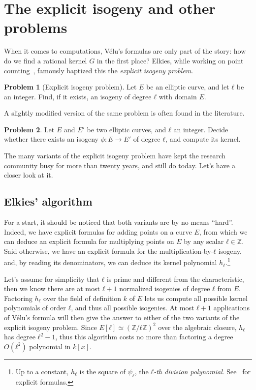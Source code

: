 \documentclass{report}
\theoremstyle{plain}
\theoremstyle{definition}
\newtheorem{problem}{Problem}
\begin{document}

\section{The explicit isogeny and other problems}

When it comes to computations, Vélu's formulas are only part of the
story: how do we find a rational kernel $G$ in the first place?
Elkies, while working on point counting~\cite{elkies92,elkies98},
famously baptized this the \emph{explicit isogeny problem}.

\begin{problem}[Explicit isogeny problem]
  \label{prob:expl-isog}
  Let $E$ be an elliptic curve, and let $ℓ$ be an integer. %
  Find, if it exists, an isogeny of degree $ℓ$ with domain $E$.
\end{problem}

A slightly modified version of the same problem is often found in the
literature.

\begin{problem}
  \label{prob:expl-isog-2}
  Let $E$ and $E'$ be two elliptic curves, and $ℓ$ an integer. %
  Decide whether there exists an isogeny $ϕ:E\to E'$ of degree $ℓ$,
  and compute its kernel.
\end{problem}

The many variants of the explicit isogeny problem have kept the
research community busy for more than twenty years, and still do
today. %
Let's have a closer look at it. %

\subsection{Elkies' algorithm}

For a start, it should be noticed that both variants are by no means
``hard''. %
Indeed, we have explicit formulas for adding points on a curve $E$,
from which we can deduce an explicit formula for multiplying points on
$E$ by any scalar $ℓ∈ℤ$. %
Said otherwise, we have an explicit formula for the
multiplication-by-$ℓ$ isogeny, and, by reading its denominators, we
can deduce its kernel polynomial $h_ℓ$.\footnote{Up to a constant,
  $h_ℓ$ is the square of $ψ_ℓ$, the \emph{$ℓ$-th division polynomial}.
  See~\cite[III.4]{blake+seroussi+smart} for explicit formulas.} %

Let's assume for simplicity that $ℓ$ is prime and different from the
characteristic, then we know there are at most $ℓ+1$ normalized
isogenies of degree $ℓ$ from $E$. %
Factoring $h_ℓ$ over the field of definition $k$ of $E$ lets us
compute all possible kernel polynomials of order $ℓ$, and thus all
possible isogenies. %
At most $ℓ+1$ applications of Vélu's formula will then give the answer
to either of the two variants of the explicit isogeny problem. %
Since $E[ℓ]≃(ℤ/ℓℤ)^2$ over the algebraic closure, $h_ℓ$ has degree
$ℓ^2-1$, thus this algorithm costs no more than factoring a degree
$O(ℓ^2)$ polynomial in $k[x]$. %
\end{document}
